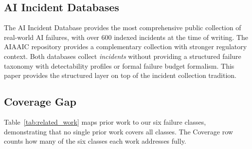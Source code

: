 \documentclass{article}
\begin{document}
\subsection{AI Incident Databases}

The AI Incident Database \citep{mcgregor2021aiid} provides the most
comprehensive public collection of real-world AI failures, with over 600
indexed incidents at the time of writing.  The AIAAIC
repository \citep{aiaaic2023} provides a complementary collection with
stronger regulatory context.  Both databases collect \emph{incidents} without
providing a structured failure taxonomy with detectability profiles or formal
failure budget formalism.  This paper provides the structured layer on top of
the incident collection tradition.

\subsection{Coverage Gap}

Table~\ref{tab:related_work} maps prior work to our six failure classes,
demonstrating that no single prior work covers all classes.  The Coverage row
counts how many of the six classes each work addresses fully.
\end{document}
